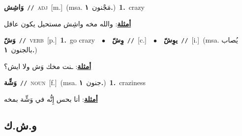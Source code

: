 \documentclass[10pt,a4paper,twoside]{article} %
\begin{document}
\begin{multicols}{2}
{\setlength\topsep{0pt}\textbf{\foreignlanguage{arabic}{وَاشِش}}\ {\color{gray}\texttt{//}\color{black}}\ \textsc{adj}\ [m.]\ \color{gray}(msa. \foreignlanguage{arabic}{مَجْنون}~\foreignlanguage{arabic}{\textbf{١.}})\color{black}\ \textbf{1.}~crazy\  \begin{flushright}\color{gray}\foreignlanguage{arabic}{\textbf{\underline{\foreignlanguage{arabic}{أمثلة}}}: والله مخه واشِش مستحيل يكون عاقل}\end{flushright}\color{black}} \vspace{2mm}

{\setlength\topsep{0pt}\textbf{\foreignlanguage{arabic}{وَشّ}}\ {\color{gray}\texttt{//}\color{black}}\ \textsc{verb}\ [p.]\ \textbf{1.}~go crazy\ \ $\bullet$\ \ \setlength\topsep{0pt}\textbf{\foreignlanguage{arabic}{وِشّ}}\ {\color{gray}\texttt{//}\color{black}}\ [c.]\ \ $\bullet$\ \ \setlength\topsep{0pt}\textbf{\foreignlanguage{arabic}{يوِشّ}}\ {\color{gray}\texttt{//}\color{black}}\ [i.]\ \color{gray}(msa. \foreignlanguage{arabic}{يُصاب بالجنون}~\foreignlanguage{arabic}{\textbf{١.}})\color{black}\  \begin{flushright}\color{gray}\foreignlanguage{arabic}{\textbf{\underline{\foreignlanguage{arabic}{أمثلة}}}: ـنت مخك وَش ولا ايش؟}\end{flushright}\color{black}} \vspace{2mm}

{\setlength\topsep{0pt}\textbf{\foreignlanguage{arabic}{وَشِّة}}\ {\color{gray}\texttt{//}\color{black}}\ \textsc{noun}\ [f.]\ \color{gray}(msa. \foreignlanguage{arabic}{جنون}~\foreignlanguage{arabic}{\textbf{١.}})\color{black}\ \textbf{1.}~craziness\  \begin{flushright}\color{gray}\foreignlanguage{arabic}{\textbf{\underline{\foreignlanguage{arabic}{أمثلة}}}: أنا بحس إِنُّه في وَشِّة بمخه}\end{flushright}\color{black}} \vspace{2mm}

\vspace{-3mm}
\subsection*{\color{blue}\foreignlanguage{arabic}{و.ش.ك}\color{blue}{}} 


\end{multicols}
\end{document}
